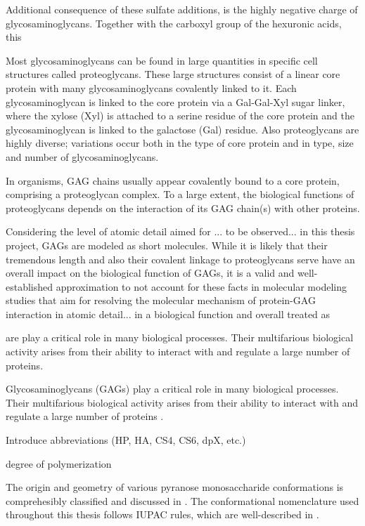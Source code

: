 Additional consequence of these sulfate additions, is the highly negative charge of glycosaminoglycans. Together with the carboxyl group of the hexuronic acids, this


Most glycosaminoglycans can be found in large quantities in specific cell structures called proteoglycans. These large structures consist of a linear core protein with many glycosaminoglycans covalently linked to it. Each glycosaminoglycan is linked to the core protein via a Gal-Gal-Xyl sugar linker, where the xylose (Xyl) is attached to a serine residue of the core protein and the glycosaminoglycan is linked to the galactose (Gal) residue. Also proteoglycans are highly diverse; variations occur both in the type of core protein and in type, size and number of glycosaminoglycans.



In organisms, GAG chains usually
appear covalently bound to a core protein, comprising a proteoglycan complex.
To a large extent, the biological functions of proteoglycans depends on the
interaction of its GAG chain(s) with other proteins.



Considering the level of atomic detail aimed for ... to be observed... in this
thesis project, GAGs are modeled as short molecules. While it is likely
that their tremendous length and also their covalent linkage to proteoglycans
serve have an overall impact on the biological function of GAGs, it is a
valid and well-established approximation to not account for these facts in
molecular modeling studies that aim for resolving the molecular mechanism of
protein-GAG interaction in atomic detail... in a biological function and overall  treated as


are play a critical role in many biological processes.
Their multifarious biological activity arises from their ability to interact
with and regulate a large number of proteins.


Glycosaminoglycans (GAGs) play a critical role in many biological processes.
Their multifarious biological activity arises from their ability to interact
with and regulate a large number of proteins \cite{handel_2005}.

Introduce abbreviations (HP, HA, CS4, CS6, dpX, etc.)


degree of polymerization


The origin and geometry of various pyranose monosaccharide conformations is
comprehesibly classified and discussed in
\cite{classification_pyranose_conformers_1960}. The conformational nomenclature
used throughout this thesis follows IUPAC rules, which are well-described in
\cite{iupac_gag_conformations_1980}.


